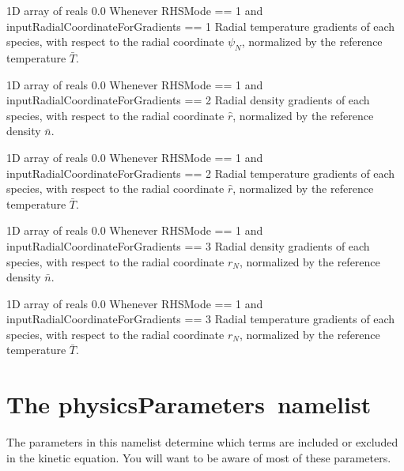 \myhrule

{1D array of reals}
{0.0}
{Whenever {\ttfamily RHSMode} == 1 and {\ttfamily inputRadialCoordinateForGradients} == 1}
{Radial temperature gradients of each species, with respect to the radial coordinate $\psi_N$, normalized by the reference temperature $\bar{T}$.}

\myhrule

{1D array of reals}
{0.0}
{Whenever {\ttfamily RHSMode} == 1 and {\ttfamily inputRadialCoordinateForGradients} == 2}
{Radial density gradients of each species, with respect to the radial coordinate $\hat{r}$, normalized by the reference density $\bar{n}$.}

\myhrule

{1D array of reals}
{0.0}
{Whenever {\ttfamily RHSMode} == 1 and {\ttfamily inputRadialCoordinateForGradients} == 2}
{Radial temperature gradients of each species, with respect to the radial coordinate $\hat{r}$, normalized by the reference temperature $\bar{T}$.}

\myhrule

{1D array of reals}
{0.0}
{Whenever {\ttfamily RHSMode} == 1 and {\ttfamily inputRadialCoordinateForGradients} == 3}
{Radial density gradients of each species, with respect to the radial coordinate $r_N$, normalized by the reference density $\bar{n}$.}

\myhrule

{1D array of reals}
{0.0}
{Whenever {\ttfamily RHSMode} == 1 and {\ttfamily inputRadialCoordinateForGradients} == 3}
{Radial temperature gradients of each species, with respect to the radial coordinate $r_N$, normalized by the reference temperature $\bar{T}$.}










\section{The {\ttfamily physicsParameters}~namelist}

The parameters in this namelist determine which terms are included or excluded in the kinetic equation.
You will want to be aware of most of these parameters.

\myhrule

